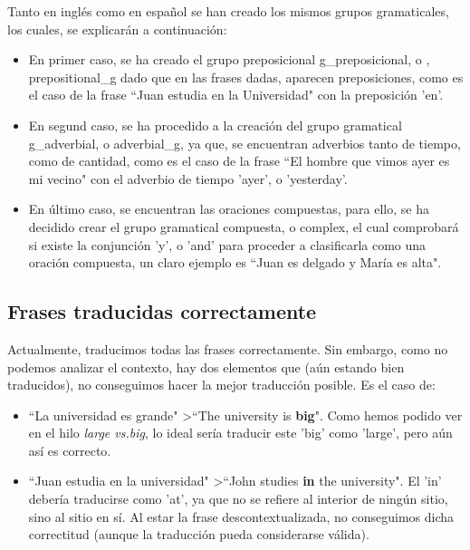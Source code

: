\documentclass[a4paper]{article}
\begin{document}
        Tanto en inglés como en español se han creado los mismos grupos gramaticales, los cuales, se explicarán a continuación:

        \begin{itemize}

            \item En primer caso, se ha creado el grupo preposicional g\_preposicional, o , prepositional\_g dado que en las frases dadas, aparecen preposiciones, como es el caso de la frase ``Juan estudia en la Universidad" con la preposición 'en'.

            \item En segund caso, se ha procedido a la creación del grupo gramatical g\_adverbial, o adverbial\_g, ya que, se encuentran adverbios tanto de tiempo, como de cantidad, como es el caso de la frase ``El hombre que vimos ayer es mi vecino" con el adverbio de tiempo 'ayer', o 'yesterday'.

            \item En último caso, se encuentran las oraciones compuestas, para ello, se ha decidido crear el grupo gramatical compuesta, o complex, el cual comprobará si existe la conjunción 'y', o 'and' para proceder a clasificarla como una oración compuesta, un claro ejemplo es ``Juan es delgado y María es alta".

        \end{itemize}

    \subsection*{Frases traducidas correctamente}

        Actualmente, traducimos todas las frases correctamente. Sin embargo, como no podemos analizar el contexto, hay dos elementos que (aún estando bien traducidos), no conseguimos hacer la mejor traducción posible. Es el caso de:

        \begin{itemize}

            \item ``La universidad es grande" \textgreater ``The university is \textbf{big}". Como hemos podido ver en el hilo \emph{large vs.big}\cite{LVB}, lo ideal sería traducir este 'big' como 'large', pero aún así es correcto.

            \item ``Juan estudia en la universidad" \textgreater ``John studies \textbf{in} the university". El 'in' debería traducirse como 'at', ya que no se refiere al interior de ningún sitio, sino al sitio en sí. Al estar la frase descontextualizada, no conseguimos dicha correctitud (aunque la traducción pueda considerarse válida).

        \end{itemize}
\end{document}
